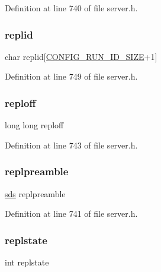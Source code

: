 Definition at line 740 of file server.\+h.

\mbox{\label{structclient_a467ab80673fbca31b4729a65effc8362}} 
\subsubsection{\texorpdfstring{replid}{replid}}
{\footnotesize\ttfamily char replid\mbox{[}\hyperlink{server_8h_aba6794fa3ee28f85165eaed93190f1df}{C\+O\+N\+F\+I\+G\+\_\+\+R\+U\+N\+\_\+\+I\+D\+\_\+\+S\+I\+ZE}+1\mbox{]}}



Definition at line 749 of file server.\+h.

\mbox{\label{structclient_a3ceb1598320b93accc65299b5ccf10d7}} 
\subsubsection{\texorpdfstring{reploff}{reploff}}
{\footnotesize\ttfamily long long reploff}



Definition at line 743 of file server.\+h.

\mbox{\label{structclient_afa5d87f20b8df88d56361da7092fb775}} 
\subsubsection{\texorpdfstring{replpreamble}{replpreamble}}
{\footnotesize\ttfamily \hyperlink{sds_8h_ad69abac3df4532879db9642c95f5ef6f}{sds} replpreamble}



Definition at line 741 of file server.\+h.

\mbox{\label{structclient_abccae535b39fffe81ee57f696b14a218}} 
\subsubsection{\texorpdfstring{replstate}{replstate}}
{\footnotesize\ttfamily int replstate}



